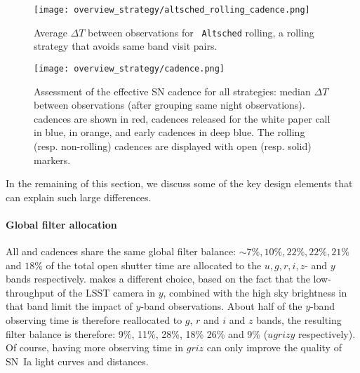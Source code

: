 \begin{figure}
  \begin{center}
    \texttt{[image: overview\_strategy/altsched\_rolling\_cadence.png]}
    \caption{Average $\Delta T$ between observations for {\tt
        Altsched} rolling, a rolling strategy that avoids same band
      visit pairs.}
    \label{fig:altsched_rolling_effective_cadences}
  \end{center}
\end{figure}

\begin{figure}
  \begin{center}
    \texttt{[image: overview\_strategy/cadence.png]}
    \caption{Assessment of the effective SN cadence for all
      strategies: median $\Delta T$ between observations (after
      grouping same night observations). \altsched cadences are shown
      in red, \opsim cadences released for the white paper call in
      blue, \slair in orange, and early cadences in deep blue. The
      rolling (resp. non-rolling) cadences are displayed with open
      (resp. solid) markers. }
    \label{fig:effective_cadence}
  \end{center}
\end{figure}

In the remaining of this section, we discuss some of the key design
elements that can explain such large differences.


\paragraph{Global filter allocation} All \opsim and \slair cadences   share the same global filter balance: 
$\sim 7\%, 10\%, 22\%, 22\%, 21\%$ and $18\%$ of the total open shutter time
are allocated to the $u, g, r, i, z$- and $y$ bands respectively.
\altsched makes a different choice, based on the fact that the
low-throughput of the LSST camera in $y$, combined with the high sky
brightness in that band limit the impact of $y$-band observations.
About half of the $y$-band observing time is therefore reallocated to
$g$, $r$ and $i$ and $z$ bands, the resulting filter balance is
therefore: 9\%, 11\%, 28\%, 18\% 26\% and 9\% ($ugrizy$ respectively). Of course, having more
observing time in $griz$ can only improve the quality of SN~Ia light curves and distances.


